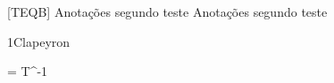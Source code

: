 \documentclass[\mainfilename]{subfiles}
\begin{document}
[TEQB]
{Anotações segundo teste} %
{Anotações segundo teste} %

\begin{sectionBox}1{Clapeyron} %
    
    \begin{BM}
        = T^{-1}
    \end{BM}
    
\end{sectionBox}
\end{document}
